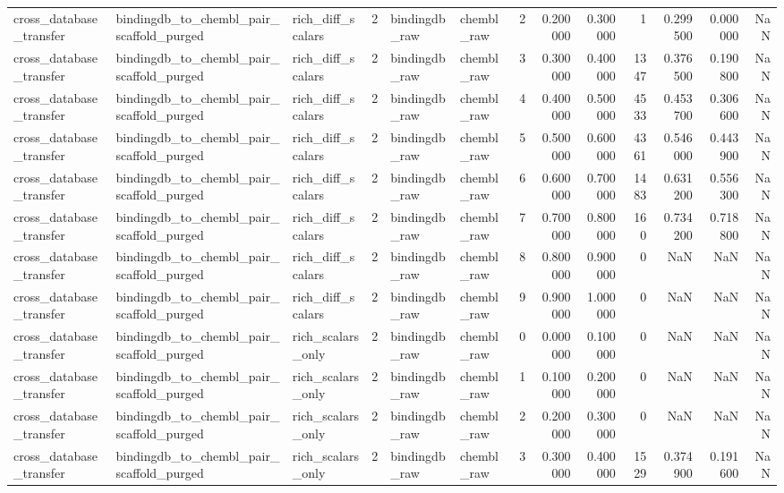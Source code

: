 \begin{longtable}{lllrllrrrrrrr}
cross\_database\_transfer & bindingdb\_to\_chembl\_pair\_scaffold\_purged & rich\_diff\_scalars & 2 & bindingdb\_raw & chembl\_raw & 2 & 0.200000 & 0.300000 & 1 & 0.299500 & 0.000000 & NaN \\
cross\_database\_transfer & bindingdb\_to\_chembl\_pair\_scaffold\_purged & rich\_diff\_scalars & 2 & bindingdb\_raw & chembl\_raw & 3 & 0.300000 & 0.400000 & 1347 & 0.376500 & 0.190800 & NaN \\
cross\_database\_transfer & bindingdb\_to\_chembl\_pair\_scaffold\_purged & rich\_diff\_scalars & 2 & bindingdb\_raw & chembl\_raw & 4 & 0.400000 & 0.500000 & 4533 & 0.453700 & 0.306600 & NaN \\
cross\_database\_transfer & bindingdb\_to\_chembl\_pair\_scaffold\_purged & rich\_diff\_scalars & 2 & bindingdb\_raw & chembl\_raw & 5 & 0.500000 & 0.600000 & 4361 & 0.546000 & 0.443900 & NaN \\
cross\_database\_transfer & bindingdb\_to\_chembl\_pair\_scaffold\_purged & rich\_diff\_scalars & 2 & bindingdb\_raw & chembl\_raw & 6 & 0.600000 & 0.700000 & 1483 & 0.631200 & 0.556300 & NaN \\
cross\_database\_transfer & bindingdb\_to\_chembl\_pair\_scaffold\_purged & rich\_diff\_scalars & 2 & bindingdb\_raw & chembl\_raw & 7 & 0.700000 & 0.800000 & 160 & 0.734200 & 0.718800 & NaN \\
cross\_database\_transfer & bindingdb\_to\_chembl\_pair\_scaffold\_purged & rich\_diff\_scalars & 2 & bindingdb\_raw & chembl\_raw & 8 & 0.800000 & 0.900000 & 0 & NaN & NaN & NaN \\
cross\_database\_transfer & bindingdb\_to\_chembl\_pair\_scaffold\_purged & rich\_diff\_scalars & 2 & bindingdb\_raw & chembl\_raw & 9 & 0.900000 & 1.000000 & 0 & NaN & NaN & NaN \\
cross\_database\_transfer & bindingdb\_to\_chembl\_pair\_scaffold\_purged & rich\_scalars\_only & 2 & bindingdb\_raw & chembl\_raw & 0 & 0.000000 & 0.100000 & 0 & NaN & NaN & NaN \\
cross\_database\_transfer & bindingdb\_to\_chembl\_pair\_scaffold\_purged & rich\_scalars\_only & 2 & bindingdb\_raw & chembl\_raw & 1 & 0.100000 & 0.200000 & 0 & NaN & NaN & NaN \\
cross\_database\_transfer & bindingdb\_to\_chembl\_pair\_scaffold\_purged & rich\_scalars\_only & 2 & bindingdb\_raw & chembl\_raw & 2 & 0.200000 & 0.300000 & 0 & NaN & NaN & NaN \\
cross\_database\_transfer & bindingdb\_to\_chembl\_pair\_scaffold\_purged & rich\_scalars\_only & 2 & bindingdb\_raw & chembl\_raw & 3 & 0.300000 & 0.400000 & 1529 & 0.374900 & 0.191600 & NaN \\

\end{longtable}
